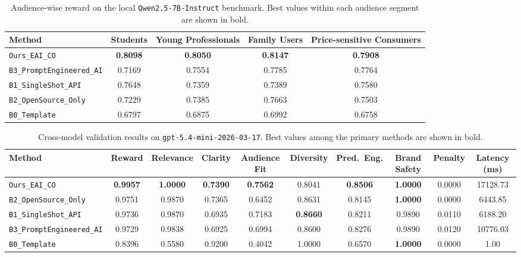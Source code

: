\begin{table}[t]
\centering
\caption{Audience-wise reward on the local \texttt{Qwen2.5-7B-Instruct} benchmark. Best values within each audience segment are shown in bold.}
\label{tab:qwen_audience}
\begin{adjustbox}{max width=\textwidth}
\begin{tabular}{lcccc}
\toprule
Method & Students & Young Professionals & Family Users & Price-sensitive Consumers \\
\midrule
\texttt{Ours\_EAI\_CO} & \textbf{0.8098} & \textbf{0.8050} & \textbf{0.8147} & \textbf{0.7908} \\
\texttt{B3\_PromptEngineered\_AI} & 0.7169 & 0.7554 & 0.7785 & 0.7764 \\
\texttt{B1\_SingleShot\_API} & 0.7648 & 0.7359 & 0.7389 & 0.7580 \\
\texttt{B2\_OpenSource\_Only} & 0.7229 & 0.7385 & 0.7663 & 0.7503 \\
\texttt{B0\_Template} & 0.6797 & 0.6875 & 0.6992 & 0.6758 \\
\bottomrule
\end{tabular}
\end{adjustbox}
\end{table}

\begin{table}[t]
\centering
\caption{Cross-model validation results on \texttt{gpt-5.4-mini-2026-03-17}. Best values among the primary methods are shown in bold.}
\label{tab:gpt_cross_model}
\begin{adjustbox}{max width=\textwidth}
\begin{tabular}{lccccccccc}
\toprule
Method & Reward & Relevance & Clarity & Audience Fit & Diversity & Pred.\ Eng. & Brand Safety & Penalty & Latency (ms) \\
\midrule
\texttt{Ours\_EAI\_CO} & \textbf{0.9957} & \textbf{1.0000} & \textbf{0.7390} & \textbf{0.7562} & 0.8041 & \textbf{0.8506} & \textbf{1.0000} & 0.0000 & 17128.73 \\
\texttt{B2\_OpenSource\_Only} & 0.9751 & 0.9870 & 0.7365 & 0.6452 & 0.8631 & 0.8145 & \textbf{1.0000} & 0.0000 & 6443.85 \\
\texttt{B1\_SingleShot\_API} & 0.9736 & 0.9870 & 0.6935 & 0.7183 & \textbf{0.8660} & 0.8211 & 0.9890 & 0.0110 & 6188.20 \\
\texttt{B3\_PromptEngineered\_AI} & 0.9729 & 0.9838 & 0.6925 & 0.6994 & 0.8600 & 0.8276 & 0.9890 & 0.0120 & 10776.03 \\
\texttt{B0\_Template} & 0.8396 & 0.5580 & 0.9200 & 0.4042 & 1.0000 & 0.6570 & \textbf{1.0000} & 0.0000 & 1.00 \\
\bottomrule
\end{tabular}
\end{adjustbox}
\end{table}

